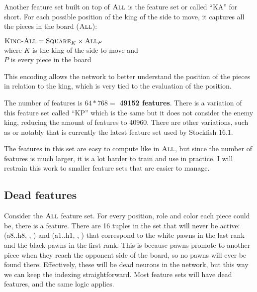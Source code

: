 Another feature set built on top of $\textsc{All}$ is the  feature set or called \enquote{KA} for short. For each possible position of the king of the side to move, it captures all the pieces in the board ($\textsc{All}$):

\begin{center}
    $\textsc{King-All} = \textsc{Square}_{K} \times \textsc{All}_{P}$ \\
    where $K$ is the king of the side to move and\\
    $P$ is every piece in the board \\
\end{center}

This encoding allows the network to better understand the position of the pieces in relation to the king, which is very tied to the evaluation of the position.

The number of features is $64*768=$ \textbf{49152 features}. There is a variation of this feature set called \enquote{KP} which is the same but it does not consider the enemy king, reducing the amount of features to 40960. There are other variations, such as  or notably  that is currently the latest feature set used by Stockfish 16.1.

The features in this set are easy to compute like in $\textsc{All}$, but since the number of features is much larger, it is a lot harder to train and use in practice. I will restrain this work to smaller feature sets that are easier to manage.

\subsection{Dead features}

Consider the $\textsc{All}$ feature set. For every position, role and color each piece could be, there is a feature. There are 16 tuples in the set that will never be active: (a8..h8, \sympawn, \white) and (a1..h1, \sympawn, \black) that correspond to the white pawns in the last rank and the black pawns in the first rank. This is because pawns promote to another piece when they reach the opponent side of the board, so no pawns will ever be found there. Effectively, these will be dead neurons in the network, but this way we can keep the indexing straightforward. Most feature sets will have dead features, and the same logic applies.

